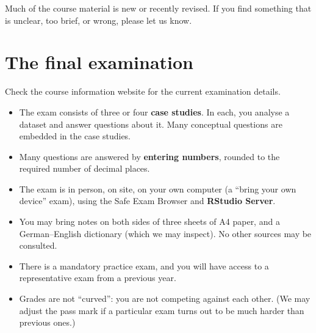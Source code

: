 \documentclass[
  letterpaper,
  8pt,
  a4paper]{book}
\providecommand{\tightlist}{%
  \setlength{\itemsep}{0pt}\setlength{\parskip}{0pt}}
\begin{document}
Much of the course material is new or recently revised. If you find
something that is unclear, too brief, or wrong, please let us know.

\section*{The final examination}\label{the-final-examination}


\begin{tcolorbox}[enhanced jigsaw, arc=.35mm, bottomrule=.15mm, bottomtitle=1mm, breakable, colback=white, colbacktitle=quarto-callout-note-color!10!white, colframe=quarto-callout-note-color-frame, coltitle=black, left=2mm, leftrule=.75mm, opacityback=0, opacitybacktitle=0.6, rightrule=.15mm, title=\textcolor{quarto-callout-note-color}{\faInfo}\hspace{0.5em}{Note}, titlerule=0mm, toprule=.15mm, toptitle=1mm]

Check the course information website for the current examination
details.

\end{tcolorbox}

\begin{itemize}
\tightlist
\item
  The exam consists of three or four \textbf{case studies}. In each, you
  analyse a dataset and answer questions about it. Many conceptual
  questions are embedded in the case studies.
\item
  Many questions are answered by \textbf{entering numbers}, rounded to
  the required number of decimal places.
\item
  The exam is in person, on site, on your own computer (a ``bring your
  own device'' exam), using the Safe Exam Browser and \textbf{RStudio
  Server}.
\item
  You may bring notes on both sides of three sheets of A4 paper, and a
  German--English dictionary (which we may inspect). No other sources
  may be consulted.
\item
  There is a mandatory practice exam, and you will have access to a
  representative exam from a previous year.
\item
  Grades are not ``curved'': you are not competing against each other.
  (We may adjust the pass mark if a particular exam turns out to be much
  harder than previous ones.)
\end{itemize}
\end{document}

